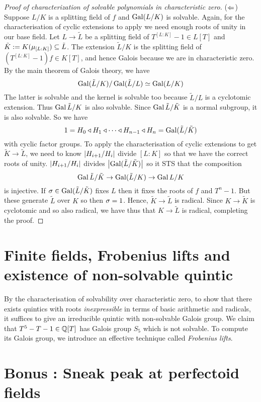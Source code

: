 \documentclass{article}
\begin{document}
\begin{proof}[Proof of characterization of solvable polynomials in characteristic zero]
  ($\Leftarrow$)
  Suppose $L / K$ is a splitting field of $f$ and
  $\operatorname{Gal}(L / K)$ is solvable.
  Again, for the characterisation of cyclic extensions to apply
  we need enough roots of unity in our base field.
  Let $L \to \tilde{L}$ be a splitting field of $T^{[L : K]} - 1 \in L[T]$
  and $\tilde{K} := K(\mu_{[L : K]}) \subseteq \tilde{L}$.
  The extension $\tilde{L} / K$ is the splitting field of
  $(T^{[L : K]} - 1) f \in K[T]$, and hence Galois because
  we are in characteristic zero.
  By the main theorem of Galois theory, we have \[
    \operatorname{Gal}(\tilde{L} / K) / \operatorname{Gal}(\tilde{L} / L) \simeq \operatorname{Gal}(L / K)
  \]
  The latter is solvable and the kernel is solvable too 
  because $\tilde{L} / L$ is a cyclotomic extension.
  Thus $\operatorname{Gal}{\tilde{L} / K}$ is also solvable.
  Since $\operatorname{Gal}{\tilde{L} / \tilde{K}}$ is a normal subgroup,
  it is also solvable.
  So we have
  \[
    1 = H_0 \triangleleft H_1 \triangleleft
    \cdots \triangleleft H_{n-1} \triangleleft H_n = \operatorname{Gal}(\tilde{L} / \tilde{K})
  \]
  with cyclic factor groups.
  To apply the characterisation of cyclic extensions
  to get $\tilde{K} \to \tilde{L}$,
  we need to know $\left\vert H_{i + 1} / H_i \right\vert$ divide $[L : K]$
  so that we have the correct roots of unity.
  $\left\vert H_{i + 1} / H_i \right\vert$ divides $\left\vert \operatorname{Gal}(\tilde{L} / \tilde{K}) \right\vert$
  so it STS that the composition 
  \[
    \operatorname{Gal}{\tilde{L} / \tilde{K}} \to \operatorname{Gal}(\tilde{L} / K) \to \operatorname{Gal}{L / K}
  \]
  is injective.
  If $\sigma \in \operatorname{Gal}(\tilde{L} / \tilde{K})$ fixes $L$
  then it fixes the roots of $f$ and $T^n - 1$.
  But these generate $\tilde{L}$ over $K$ so then $\sigma = 1$.
  Hence, $\tilde{K} \to \tilde{L}$ is radical.
  Since $K \to \tilde{K}$ is cyclotomic and so also radical,
  we have thus that $K \to \tilde{L}$ is radical, completing the proof.
\end{proof}

\section{Finite fields, Frobenius lifts and existence of non-solvable quintic}

By the characterisation of solvability over characteristic zero,
to show that there exists quintics with roots 
\emph{inexpressible} in terms of basic arithmetic and radicals,
it suffices to give an irreducible quintic with non-solvable Galois group.
We claim that $T^5 - T - 1 \in \mathbb{Q}[T]$ has Galois group $S_5$ 
which is not solvable.
To compute its Galois group, we introduce an effective technique
called \emph{Frobenius lifts}.

\section{Bonus : Sneak peak at perfectoid fields}

\printbibliography
\end{document}

